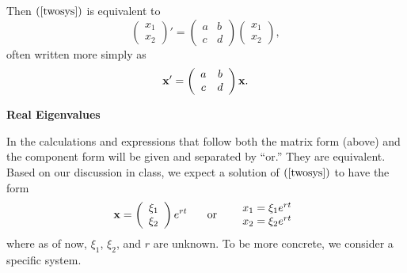 \documentclass[leqno,DIV=calc,paper=a4,fontsize=11pt]{article}
\theoremstyle{definition}
\theoremstyle{plain}
\theoremstyle{remark}
\newcommand{\R}[1]{$(\ref{#1})$}
\begin{document}
Then \R{twosys} is equivalent to
\[
\left(
\begin{array}{c}x_1\\x_2\end{array}
\right)'=
\left(
\begin{array}{cc}a&b\\c&d\end{array}
\right)
\left(
\begin{array}{c}x_1\\x_2\end{array}
\right),
\]
often written more simply as
\[
{\bf x}' = \left(
\begin{array}{cc}a&b\\c&d\end{array}
\right){\bf x}.
\]

\begin{center}{\bf\sc Real Eigenvalues}\end{center}

In the calculations and expressions that follow both the matrix form
(above) and the component form will be given and separated by ``or.''
They are equivalent. Based on our discussion in class, we expect a
solution of \R{twosys} to have the form
\begin{equation}
{\bf x} = \left(\begin{array}{c}\xi_1\\ \xi_2\end{array}\right)e^{rt}
\hspace{.25in} \mbox{or} \hspace{.25in}
\begin{array}{cc}x_1=\xi_1e^{rt}\\x_2=\xi_2e^{rt}\end{array}
\label{guess}
\end{equation}
where as of now, $\xi_1$, $\xi_2$, and $r$ are unknown. To be more
concrete, we consider a specific system.
\end{document}
